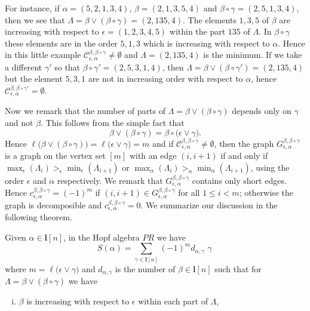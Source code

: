 \documentclass[ALCO,ThmDefs,Unicode,epreuves]{cedram}
\begin{document}
\begin{exam}
For instance, if $\alpha=(5,2,1,3,4)$, $\beta=(2,1,3,5,4)$ and $\beta\circ\gamma=(2,5,1,3,4)$, then we see that $\Lambda=\beta\lor(\beta\circ\gamma)=(2,135,4)$. The elements $1,3,5$ of $\beta$ are increasing with respect
to $\epsilon=(1,2,3,4,5)$ within the part $135$ of $\Lambda$. In $\beta\circ\gamma$ these elements are in the order $5,1,3$ which is increasing with respect to $\alpha$. Hence in this little example
 $\mathcal{C}_{\epsilon,\alpha}^{\beta, \beta\circ\gamma}\ne \emptyset$ and $\Lambda=(2,135,4)$ is the minimum. If we take a different $\gamma'$ so that $\beta\circ\gamma'=(2,5,3,1,4)$,
 then $\Lambda=\beta\lor(\beta\circ\gamma')=(2,135,4)$ but the element $5,3,1$ are not in increasing order with respect to $\alpha$, hence $\mathcal{C}_{\epsilon,\alpha}^{\beta, \beta\circ\gamma'}= \emptyset$.

Now we remark that the number of parts of $\Lambda=\beta\lor(\beta\circ\gamma)$ depends only on $\gamma$ and not $\beta$. This follows from the simple fact that
 $$ \beta\lor(\beta\circ\gamma) = \beta\circ\big( \epsilon\lor\gamma\big).$$
 Hence $\ell\big(\beta\lor(\beta\circ\gamma)\big)=\ell\big( \epsilon\lor\gamma\big)=m$ and if $\mathcal{C}_{\epsilon,\alpha}^{\beta, \beta\circ\gamma}\ne \emptyset$, then the graph $G_{\epsilon,\alpha}^{\beta, \beta\circ\gamma}$ is a graph on the vertex set $[m]$ 
 with an edge $(i,i+1)$ if and only if $\max_\epsilon(\Lambda_i)>_\epsilon\min_\epsilon(\Lambda_{i+1})$ or $\max_\alpha(\Lambda_i)>_\alpha \min_\alpha(\Lambda_{i+1})$, using the order $\epsilon$ and $\alpha$ respectively. We remark that $G_{\epsilon,\alpha}^{\beta, \beta\circ\gamma}$ contains only short edges. Hence $c_{\epsilon,\alpha}^{\beta, \beta\circ\gamma}=(-1)^m$ if $(i,i+1)\in G_{\epsilon,\alpha}^{\beta, \beta\circ\gamma}$ for all $1\le i<m$; otherwise the graph is decomposible and $c_{\epsilon,\alpha}^{\beta, \beta\circ\gamma}=0$. We summarize our discussion in the following theorem.
 \begin{theorem} \label{thm:AntipodePR}
 Given $\alpha\in\mathbf{l}[n]$, in the Hopf algebra $PR$ we have
 $$S(\alpha)=\sum_{\gamma\in\mathbf{l}[n]}(-1)^{m} d_{\alpha,\gamma}\,\, \gamma\,$$
 where $m=\ell\big( \epsilon\lor\gamma\big)$ and $d_{\alpha,\gamma}$ is the number of $\beta\in\mathbf{l}[n]$ such that for $\Lambda=\beta\lor(\beta\circ\gamma)$ we have
\begin{enumerate}[(i)]
 \item\label{theo4.9i} $\beta$ is increasing with respect to $\epsilon$ within each part of $\Lambda$,

\end{enumerate}
\end{theorem}
\end{exam}
\end{document}
